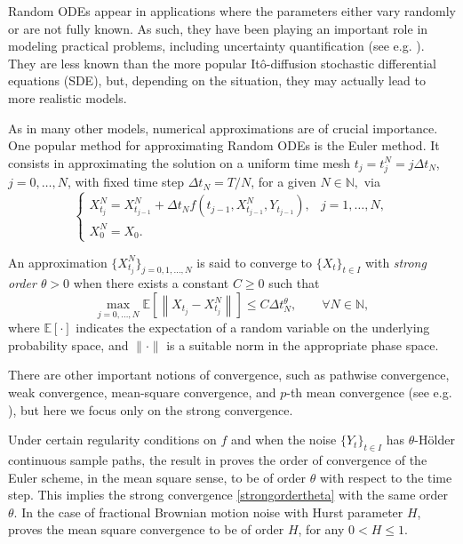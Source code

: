 \documentclass[reqno,12pt]{amsart}
\theoremstyle{plain} %
\theoremstyle{definition} %
\begin{document}
Random ODEs appear in applications where the parameters either vary randomly or are not fully known. As such, they have been playing an important role in modeling practical problems, including uncertainty quantification (see e.g. \cite{Asai2016,BogdanoffGoldbergBernard1961,FreidlinWentzell1992,HanKloeden2017,MerdanBekiryaziciKesemenKhaniyev2017,NeckelRupp2013,SalakoShen2020,StrasserTheisMarr2012}). They are less known than the more popular It\^o-diffusion stochastic differential equations (SDE), but, depending on the situation, they may actually lead to more realistic models.

As in many other models, numerical approximations are of crucial importance. One popular method for approximating Random ODEs is the Euler method. It consists in approximating the solution on a uniform time mesh $t_j = t_j^N = j\Delta t_N$, $j = 0, \ldots, N$, with fixed time step $\Delta t_N = T/N$, for a given $N\in \mathbb{N},$ via
\begin{equation}
  \label{emscheme}
  \begin{cases}
    X_{t_j}^N = X_{t_{j-1}}^N + \Delta t_N f(t_{j-1}, X_{t_{j-1}}^N, Y_{t_{j-1}}), & j = 1, \ldots, N, \\
    X_0^N = X_0.
  \end{cases}
\end{equation}

An approximation $\{X_{t_j}^N\}_{j = 0, 1, \ldots, N}$ is said to converge to $\{X_t\}_{t\in I}$ with \emph{strong order $\theta>0$} when there exists a constant $C \geq 0$ such that
\begin{equation}
    \label{strongordertheta}
    \max_{j=0, \ldots, N}\mathbb{E}\left[ \left\| X_{t_j} - X_{t_j}^N \right\| \right] \leq C \Delta t_N^\theta, \qquad \forall N \in \mathbb{N},
\end{equation}
where $\mathbb{E}[\cdot]$ indicates the expectation of a random variable on the underlying probability space, and $\|\cdot\|$ is a suitable norm in the appropriate phase space.

There are other important notions of convergence, such as pathwise convergence, weak convergence, mean-square convergence, and $p$-th mean convergence (see e.g. \cite{AsaiKloeden2016,GruneKloeden2001,HanKloeden2017,HighamKloeden2021,JentzenKloeden2011,KloedenJentzen2007}), but here we focus only on the strong convergence.

Under certain regularity conditions on $f$ and when the noise $\{Y_t\}_{t\in I}$ has $\theta$-H\"older continuous sample paths, the result in \cite[Theorem 3]{WangCaoHanKloeden2021} proves the order of convergence of the Euler scheme, in the mean square sense, to be of order $\theta$ with respect to the time step. This implies the strong convergence \cref{strongordertheta} with the same order $\theta$. In the case of fractional Brownian motion noise with Hurst parameter $H$, \cite[Theorem 2]{WangCaoHanKloeden2021} proves the mean square convergence to be of order $H$, for any $0 < H \leq 1.$
\end{document}
